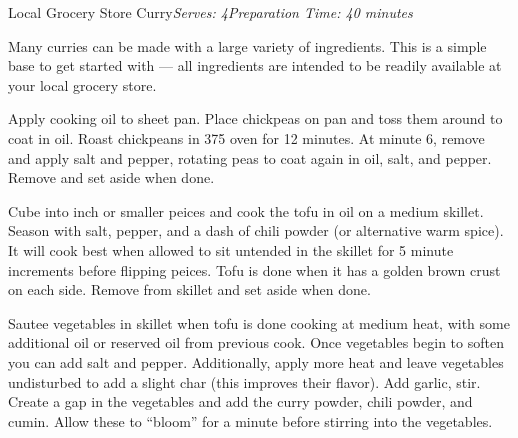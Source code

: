 \documentclass{article}
\begin{document}
\begin{recipe}{Local Grocery Store Curry}{\textit{Serves:  4}}{\textit{Preparation Time: 40 minutes}}
  
  \freeform
    Many curries can be made with a large variety of ingredients.
    This is a simple base to get started with --- all ingredients are intended to be readily available at your local grocery store.

    
    Apply cooking oil to sheet pan.
    Place chickpeas on pan and toss them around to coat in oil.
    Roast chickpeans in 375\0 oven for 12 minutes.
    At minute 6, remove and apply salt and pepper, rotating peas to coat again in oil, salt, and pepper.
    Remove and set aside when done.

  
    Cube into  inch or smaller peices and cook the tofu in oil on a medium skillet.
    Season with salt, pepper, and a dash of chili powder (or alternative warm spice).
    It will cook best when allowed to sit untended in the skillet for 5 minute increments before flipping peices.
    Tofu is done when it has a golden brown crust on each side.
    Remove from skillet and set aside when done.
  
    
    Sautee vegetables in skillet when tofu is done cooking at medium heat, with some additional oil or reserved oil from previous cook.
    Once vegetables begin to soften you can add salt and pepper.
    Additionally, apply more heat and leave vegetables undisturbed to add a slight char (this improves their flavor).
    Add garlic, stir.
    Create a gap in the vegetables and add the curry powder, chili powder, and cumin.
    Allow these to ``bloom'' for a minute before stirring into the vegetables.


\end{recipe}
\end{document}
